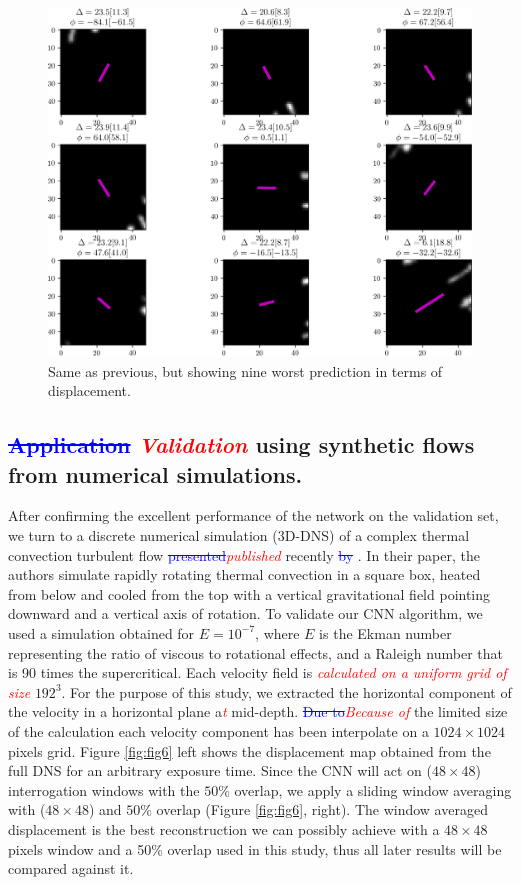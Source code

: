 \documentclass{svjour3}                     %
\newcommand{\new}[1]{\textit{\textcolor{red}{#1}}}
\newcommand{\old}[1]{\textcolor{blue}{\sout{#1}}}
\begin{document}
\begin{figure}
\includegraphics[width=\textwidth]{figs/figure4.png}
\caption{Same as previous, but showing nine worst prediction in terms of displacement.}
\label{fig:fig5}
\end{figure}

\subsection{\old{Application} \new{Validation} using synthetic flows from numerical simulations.}

After confirming the excellent performance of the network on the validation set, we turn to a discrete numerical simulation (3D-DNS) of a complex thermal convection turbulent flow \old{presented}\new{published} recently \old{by} \cite{plumley2016effects}. In their paper, the authors simulate rapidly rotating thermal convection in a square box, heated from below and cooled from the top with a vertical gravitational field pointing downward and a vertical axis of rotation. To validate our CNN algorithm, we used a simulation obtained for $E=10^{-7}$, where $E$ is the Ekman number representing the ratio of viscous to rotational effects, and a Raleigh number that is 90 times the supercritical. Each velocity field is \new{calculated on a uniform grid of size} $192^3$. For the purpose of this study, we extracted the horizontal component of the velocity in a horizontal plane a\new{t} mid-depth. \old{Due to}\new{Because of} the limited size of the calculation each velocity component has been interpolate on a $1024\times 1024$ pixels grid. 
Figure \ref{fig:fig6} left shows the displacement map obtained from the full DNS for an arbitrary exposure time. Since the CNN will act on ($48\times48$) interrogation windows with the $50\%$ overlap, we apply a sliding window averaging with ($48\times48$) and $50\%$ overlap (Figure \ref{fig:fig6}, right). The window averaged displacement is the best reconstruction we can possibly achieve with a $48 \times 48$ pixels window and a 50\% overlap used in this study, thus all later results will be compared against it.
\end{document}
